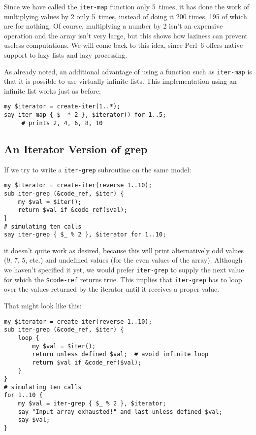 Since we have called the {\tt iter-map} function only 5~times, 
it has done the work of multiplying values by 2 only 5~times, 
instead of doing it 200 times, 195 of which are for nothing. 
Of course, multiplying a number by 2 isn't an expensive 
operation and the array isn't very large, but this shows 
how laziness can prevent useless computations. We will come 
back to this idea, since Perl~6 offers native support to lazy 
lists and lazy processing.

As already noted, an additional advantage of using a function 
such as {\tt iter-map} is that it is possible to use 
virtually infinite lists. This implementation using an 
infinite list works just as before:

\begin{verbatim}
my $iterator = create-iter(1..*);
say iter-map { $_ * 2 }, $iterator() for 1..5;
     # prints 2, 4, 6, 8, 10
\end{verbatim}

\subsection{An Iterator Version of grep}

If we try to write a {\tt iter-grep} subroutine on the same 
model:

\begin{verbatim}
my $iterator = create-iter(reverse 1..10);
sub iter-grep (&code_ref, $iter) {
    my $val = $iter();
    return $val if &code_ref($val);
}
# simulating ten calls
say iter-grep { $_ % 2 }, $iterator for 1..10;
\end{verbatim}

it doesn't quite work as desired, because this will print 
alternatively odd values (9, 7, 5, etc.) and undefined 
values (for the even values of the array). Although we 
haven't specified it yet, we would prefer {\tt iter-grep} 
to supply the next value for which the \verb'$code-ref' 
returns true. This implies that {\tt iter-grep} has to 
loop over the values returned by the iterator until it 
receives a proper value.

That might look like this:

\begin{verbatim}
my $iterator = create-iter(reverse 1..10);
sub iter-grep (&code_ref, $iter) {
    loop {
        my $val = $iter();
        return unless defined $val;  # avoid infinite loop
        return $val if &code_ref($val);
	}
}
# simulating ten calls
for 1..10 {
    my $val = iter-grep { $_ % 2 }, $iterator;
    say "Input array exhausted!" and last unless defined $val;
    say $val;
}
\end{verbatim}

